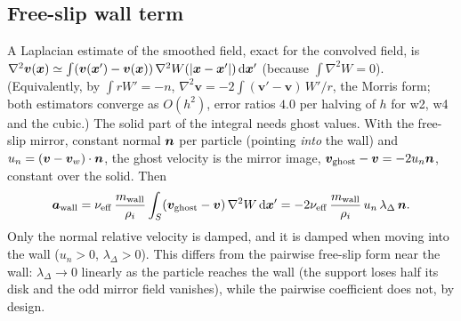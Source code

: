 \subsection{Free-slip wall term}
A Laplacian estimate of the smoothed field, exact for the convolved field, is $\nabla^2\bm v(\bm x)\simeq\int(\bm v(\bm x')-\bm v(\bm x))\,\nabla^2W(|\bm x-\bm x'|)\,\mathrm{d}\bm x'$ (because $\int\nabla^2W=0$).
(Equivalently, by $\int rW'=-n$, $\nabla^2\bm v=-2\int(\bm v'-\bm v)\,W'/r$, the Morris form; both estimators converge as $O(h^2)$, error ratios $4.0$ per halving of $h$ for w2, w4 and the cubic.) The solid part of the integral needs ghost values. With the free-slip mirror, constant normal $\bm n$ per particle (pointing \emph{into} the wall) and
$u_n=(\bm v-\bm v_w)\cdot\bm n$, the ghost velocity is the mirror image, $\bm v_{\rm ghost}-\bm v=-2u_n\bm n$, constant over the solid. Then
\begin{equation}\label{eq:freeslip}
 \bm a_{\rm wall}=\nu_{\rm eff}\,\frac{m_{\rm wall}}{\rho_i}\int_S(\bm v_{\rm ghost}-\bm v)\,\nabla^2W\,\mathrm{d}\bm x'=-2\nu_{\rm eff}\,\frac{m_{\rm wall}}{\rho_i}\,u_n\,\lambda_\Delta\,\bm n .
\end{equation}
Only the normal relative velocity is damped, and it is damped when moving into the wall ($u_n>0$, $\lambda_\Delta>0$). This differs from the pairwise free-slip form near the wall: $\lambda_\Delta\to0$
linearly as the particle reaches the wall (the support loses half its disk and the odd mirror field vanishes), while the pairwise coefficient does not, by design. 


